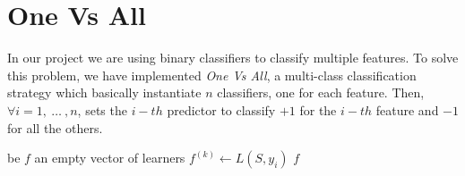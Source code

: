 \chapter{One Vs All}
In our project we are using binary classifiers to classify multiple features. To solve this problem, we have implemented \textit{One Vs All}, a multi-class classification strategy which basically instantiate $n$ classifiers, one for each feature. Then, $\forall i = 1,\:\dots\:,n$, sets the $i-th$ predictor to classify $+1$ for the $i-th$ feature and $-1$ for all the others.\\ 
\begin{algorithm}[htpb]
	\caption{}
	\label{alg:dstumps}
	\begin{algorithmic}[1]
		\State be $f$ an empty vector of learners
			\State $f^{(k)} \gets L(S,y_{i})$
		\EndFor
		\Return $f$
		\EndProcedure
	\end{algorithmic}
\end{algorithm}